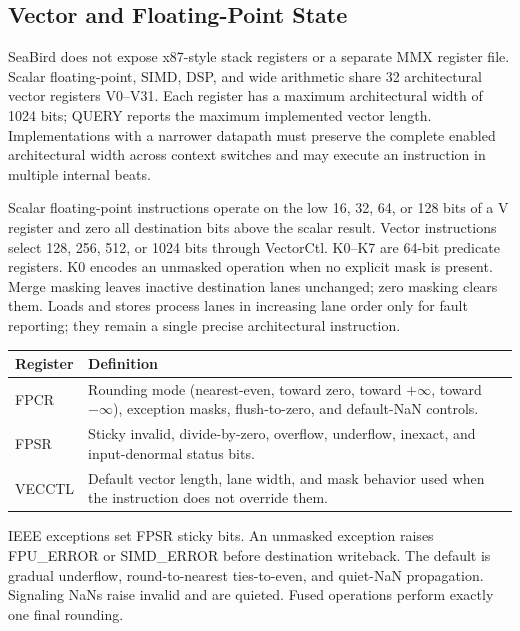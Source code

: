 \documentclass[11pt]{article}
\begin{document}
\subsection{Vector and Floating-Point State}

SeaBird does not expose x87-style stack registers or a separate MMX register file. Scalar floating-point, SIMD, DSP, and wide arithmetic share 32 architectural vector registers V0--V31. Each register has a maximum architectural width of 1024 bits; QUERY reports the maximum implemented vector length. Implementations with a narrower datapath must preserve the complete enabled architectural width across context switches and may execute an instruction in multiple internal beats.

Scalar floating-point instructions operate on the low 16, 32, 64, or 128 bits of a V register and zero all destination bits above the scalar result. Vector instructions select 128, 256, 512, or 1024 bits through VectorCtl. K0--K7 are 64-bit predicate registers. K0 encodes an unmasked operation when no explicit mask is present. Merge masking leaves inactive destination lanes unchanged; zero masking clears them. Loads and stores process lanes in increasing lane order only for fault reporting; they remain a single precise architectural instruction.

\begin{table}[h]
\centering
\begin{tabular}{@{}L{2.5cm}L{9.7cm}@{}}
\toprule
\textbf{Register} & \textbf{Definition} \\ \midrule
FPCR & Rounding mode (nearest-even, toward zero, toward $+\infty$, toward $-\infty$), exception masks, flush-to-zero, and default-NaN controls. \\
FPSR & Sticky invalid, divide-by-zero, overflow, underflow, inexact, and input-denormal status bits. \\
VECCTL & Default vector length, lane width, and mask behavior used when the instruction does not override them. \\ \bottomrule
\end{tabular}
\end{table}

IEEE exceptions set FPSR sticky bits. An unmasked exception raises FPU\_ERROR or SIMD\_ERROR before destination writeback. The default is gradual underflow, round-to-nearest ties-to-even, and quiet-NaN propagation. Signaling NaNs raise invalid and are quieted. Fused operations perform exactly one final rounding.
\end{document}
